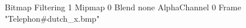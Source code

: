 {Bitmap
	{Filtering 1}
	{Mipmap 0}
	{Blend none}
	{AlphaChannel 0}
	{Frame "Telephon#dutch_x.bmp"}
}
